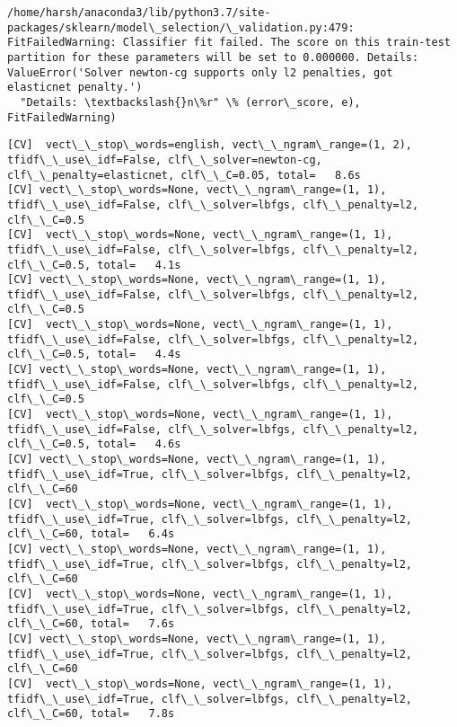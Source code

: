 \documentclass[11pt]{article}
\begin{document}
    \begin{Verbatim}[commandchars=\\\{\}]
/home/harsh/anaconda3/lib/python3.7/site-packages/sklearn/model\_selection/\_validation.py:479: FitFailedWarning: Classifier fit failed. The score on this train-test partition for these parameters will be set to 0.000000. Details: 
ValueError('Solver newton-cg supports only l2 penalties, got elasticnet penalty.')
  "Details: \textbackslash{}n\%r" \% (error\_score, e), FitFailedWarning)

    \end{Verbatim}

    \begin{Verbatim}[commandchars=\\\{\}]
[CV]  vect\_\_stop\_words=english, vect\_\_ngram\_range=(1, 2), tfidf\_\_use\_idf=False, clf\_\_solver=newton-cg, clf\_\_penalty=elasticnet, clf\_\_C=0.05, total=   8.6s
[CV] vect\_\_stop\_words=None, vect\_\_ngram\_range=(1, 1), tfidf\_\_use\_idf=False, clf\_\_solver=lbfgs, clf\_\_penalty=l2, clf\_\_C=0.5 
[CV]  vect\_\_stop\_words=None, vect\_\_ngram\_range=(1, 1), tfidf\_\_use\_idf=False, clf\_\_solver=lbfgs, clf\_\_penalty=l2, clf\_\_C=0.5, total=   4.1s
[CV] vect\_\_stop\_words=None, vect\_\_ngram\_range=(1, 1), tfidf\_\_use\_idf=False, clf\_\_solver=lbfgs, clf\_\_penalty=l2, clf\_\_C=0.5 
[CV]  vect\_\_stop\_words=None, vect\_\_ngram\_range=(1, 1), tfidf\_\_use\_idf=False, clf\_\_solver=lbfgs, clf\_\_penalty=l2, clf\_\_C=0.5, total=   4.4s
[CV] vect\_\_stop\_words=None, vect\_\_ngram\_range=(1, 1), tfidf\_\_use\_idf=False, clf\_\_solver=lbfgs, clf\_\_penalty=l2, clf\_\_C=0.5 
[CV]  vect\_\_stop\_words=None, vect\_\_ngram\_range=(1, 1), tfidf\_\_use\_idf=False, clf\_\_solver=lbfgs, clf\_\_penalty=l2, clf\_\_C=0.5, total=   4.6s
[CV] vect\_\_stop\_words=None, vect\_\_ngram\_range=(1, 1), tfidf\_\_use\_idf=True, clf\_\_solver=lbfgs, clf\_\_penalty=l2, clf\_\_C=60 
[CV]  vect\_\_stop\_words=None, vect\_\_ngram\_range=(1, 1), tfidf\_\_use\_idf=True, clf\_\_solver=lbfgs, clf\_\_penalty=l2, clf\_\_C=60, total=   6.4s
[CV] vect\_\_stop\_words=None, vect\_\_ngram\_range=(1, 1), tfidf\_\_use\_idf=True, clf\_\_solver=lbfgs, clf\_\_penalty=l2, clf\_\_C=60 
[CV]  vect\_\_stop\_words=None, vect\_\_ngram\_range=(1, 1), tfidf\_\_use\_idf=True, clf\_\_solver=lbfgs, clf\_\_penalty=l2, clf\_\_C=60, total=   7.6s
[CV] vect\_\_stop\_words=None, vect\_\_ngram\_range=(1, 1), tfidf\_\_use\_idf=True, clf\_\_solver=lbfgs, clf\_\_penalty=l2, clf\_\_C=60 
[CV]  vect\_\_stop\_words=None, vect\_\_ngram\_range=(1, 1), tfidf\_\_use\_idf=True, clf\_\_solver=lbfgs, clf\_\_penalty=l2, clf\_\_C=60, total=   7.8s

\end{Verbatim}
\end{document}
